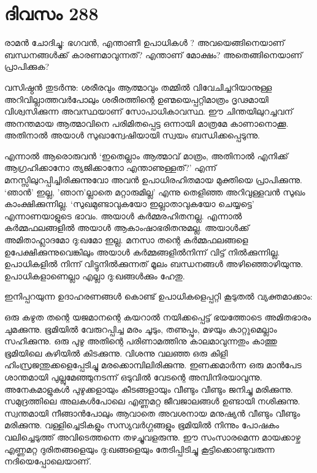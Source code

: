 \section{ദിവസം 288}


 രാമന്‍ ചോദിച്ചു: ഭഗവന്‍, എന്താണീ ഉപാധികള്‍ ? അവയെങ്ങിനെയാണ് ബന്ധനങ്ങള്‍ക്ക് കാരണമാവുന്നത്? എന്താണ് മോക്ഷം? അതെങ്ങിനെയാണ് പ്രാപിക്കുക?

വസിഷ്ഠന്‍ തുടര്‍ന്നു: ശരീരവും ആത്മാവും തമ്മില്‍ വിവേചിച്ചറിയാനുള്ള അറിവില്ലാത്തവര്‍പോലും   ശരീരത്തിന്റെ ഉണ്മയെപ്പറ്റിമാത്രം ദൃഢമായി വിശ്വസിക്കുന്ന അവസ്ഥയാണ് സോപാധികാവസ്ഥ. ഈ ചിന്തയിലുറച്ചവന് അനന്തമായ ആത്മാവിനെ പരിമിതപ്പെട്ട ഒന്നായി മാത്രമേ കാണാനൊക്കൂ. അതിനാല്‍ അയാള്‍ സുഖാന്വേഷിയായി സ്വയം ബന്ധിക്കപ്പെടുന്നു.  

എന്നാല്‍ ആരൊരുവന്‍ ‘ഇതെല്ലാം ആത്മാവ് മാത്രം, അതിനാല്‍ എനിക്ക് ആഗ്രഹിക്കാനോ ത്യജിക്കാനോ എന്താണുള്ളത്?’ എന്ന് മനസ്സിലുറപ്പിച്ചിരിക്കുന്നുവോ അവന്‍ ഉപാധിരഹിതമായ മുക്തിയെ പ്രാപിക്കുന്നു. ‘ഞാന്‍'  ഇല്ല, 'ഞാന'ല്ലാതെ മറ്റാരുമില്ല’ എന്നു തെളിഞ്ഞ അറിവുള്ളവന്‍ സുഖം കാംക്ഷിക്കുന്നില്ല. ‘സുഖമുണ്ടാവുകയോ ഇല്ലാതാവുകയോ ചെയ്യട്ടെ’ എന്നാണയാളുടെ ഭാവം. അയാള്‍ കര്‍മ്മരഹിതനല്ല. എന്നാല്‍ കര്‍മ്മഫലങ്ങളില്‍ അയാള്‍ ആകാംഷാഭരിതനുമല്ല. അയാള്‍ക്ക്  അമിതാഹ്ലാദമോ ദു:ഖമോ ഇല്ല. മനസാ തന്റെ കര്‍മ്മഫലങ്ങളെ ഉപേക്ഷിക്കുന്നുവെങ്കിലും അയാള്‍ കര്‍മ്മങ്ങളില്‍നിന്ന് വിട്ട് നില്‍ക്കുന്നില്ല.  ഉപാധികളില്‍ നിന്ന് വിട്ടുനില്‍ക്കുന്നത് മൂലം ബന്ധനങ്ങള്‍ അഴിഞ്ഞൊഴിയുന്നു.  ഉപാധികളാണെല്ലാ എല്ലാ ദു:ഖങ്ങള്‍ക്കും ഹേതു.   

ഇനിപ്പറയുന്ന ഉദാഹരണങ്ങള്‍ കൊണ്ട് ഉപാധികളെപ്പറ്റി കൂടുതല്‍ വ്യക്തമാക്കാം:

ഒരു കഴുത തന്റെ യജമാനന്റെ കയറാല്‍ നയിക്കപ്പെട്ട് ഭയത്തോടെ അമിതഭാരം ചുമക്കുന്നു. ഭൂമിയില്‍ വേരുറപ്പിച്ച മരം ചൂടും, തണുപ്പും, മഴയും കാറ്റുമെല്ലാം സഹിക്കുന്നു. ഒരു പുഴു അതിന്റെ പരിണാമത്തിനു കാലമാവുന്നതും കാത്തു ഭൂമിയിലെ കുഴിയില്‍ കിടക്കുന്നു. വിശന്നു വലഞ്ഞ ഒരു കിളി ഹിംസ്രജന്തുക്കളെപ്പേടിച്ചു മരക്കൊമ്പിലിരിക്കുന്നു.
ഇണക്കമാര്‍ന്ന ഒരു മാന്‍പേട ശാന്തമായി പുല്ലുമേഞ്ഞുനടന്ന് ഒടുവില്‍ വേടന്റെ അമ്പിനിരയാവുന്നു. അനേകമാളുകള്‍ പുഴുക്കളായും കീടങ്ങളായും വീണ്ടും വീണ്ടും ജനിച്ചു മരിക്കുന്നു. സമുദ്രത്തിലെ അലകള്‍പോലെ എണ്ണമറ്റ ജീവജാലങ്ങള്‍ ഉണ്ടായി നശിക്കുന്നു. സ്വന്തമായി നീങ്ങാന്‍പോലും ആവാതെ അവശനായ മനുഷ്യന്‍ വീണ്ടും വീണ്ടും മരിക്കുന്നു. വള്ളിച്ചെടികളും സസ്യവര്‍ഗ്ഗങ്ങളും ഭൂമിയില്‍ നിന്നും പോഷകം വലിച്ചെടുത്ത് അവിടെത്തന്നെ തഴച്ചുവളരുന്നു.
ഈ സംസാരമെന്ന മായക്കാഴ്ച എണ്ണമറ്റ ദുരിതങ്ങളെയും ദു:ഖങ്ങളെയും തേടിപ്പിടിച്ചു കൂട്ടിക്കൊണ്ടുവരുന്ന നദിയെപ്പോലെയാണ്.

